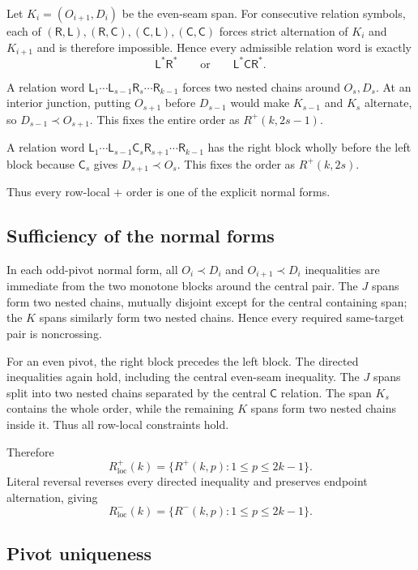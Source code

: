 \documentclass[11pt]{article}
\theoremstyle{definition}
\theoremstyle{remark}
\begin{document}
Let \(K_i=(O_{i+1},D_i)\) be the even-seam span. For consecutive
relation symbols, each of
\((\mathsf R,\mathsf L),(\mathsf R,\mathsf C),(\mathsf C,\mathsf L),(\mathsf C,\mathsf C)\)
forces strict alternation of \(K_i\) and \(K_{i+1}\) and is therefore
impossible. Hence every admissible relation word is exactly \[
\mathsf L^*\mathsf R^*\qquad\text{or}\qquad \mathsf L^*\mathsf C\mathsf R^*.
\]

A relation word
\(\mathsf L_1\cdots \mathsf L_{s-1}\mathsf R_s\cdots \mathsf R_{k-1}\)
forces two nested chains around \(O_s,D_s\). At an interior junction,
putting \(O_{s+1}\) before \(D_{s-1}\) would make \(K_{s-1}\) and
\(K_s\) alternate, so \(D_{s-1}\prec O_{s+1}\). This fixes the entire
order as \(R^+(k,2s-1)\).

A relation word
\(\mathsf L_1\cdots \mathsf L_{s-1}\mathsf C_s\mathsf R_{s+1}\cdots \mathsf R_{k-1}\)
has the right block wholly before the left block because \(\mathsf C_s\)
gives \(D_{s+1}\prec O_s\). This fixes the order as \(R^+(k,2s)\).

Thus every row-local \(+\) order is one of the explicit normal forms.

\subsection{Sufficiency of the normal
forms}\label{a.3.-sufficiency-of-the-normal-forms}

In each odd-pivot normal form, all \(O_i\prec D_i\) and
\(O_{i+1}\prec D_i\) inequalities are immediate from the two monotone
blocks around the central pair. The \(J\) spans form two nested chains,
mutually disjoint except for the central containing span; the \(K\)
spans similarly form two nested chains. Hence every required same-target
pair is noncrossing.

For an even pivot, the right block precedes the left block. The directed
inequalities again hold, including the central even-seam inequality. The
\(J\) spans split into two nested chains separated by the central
\(\mathsf C\) relation. The span \(K_s\) contains the whole order, while
the remaining \(K\) spans form two nested chains inside it. Thus all
row-local constraints hold.

Therefore \[
R_{\mathrm{loc}}^+(k)=\{R^+(k,p):1\le p\le2k-1\}.
\] Literal reversal reverses every directed inequality and preserves
endpoint alternation, giving \[
R_{\mathrm{loc}}^-(k)=\{R^-(k,p):1\le p\le2k-1\}.
\]

\subsection{Pivot uniqueness}\label{a.4.-pivot-uniqueness}
\end{document}
